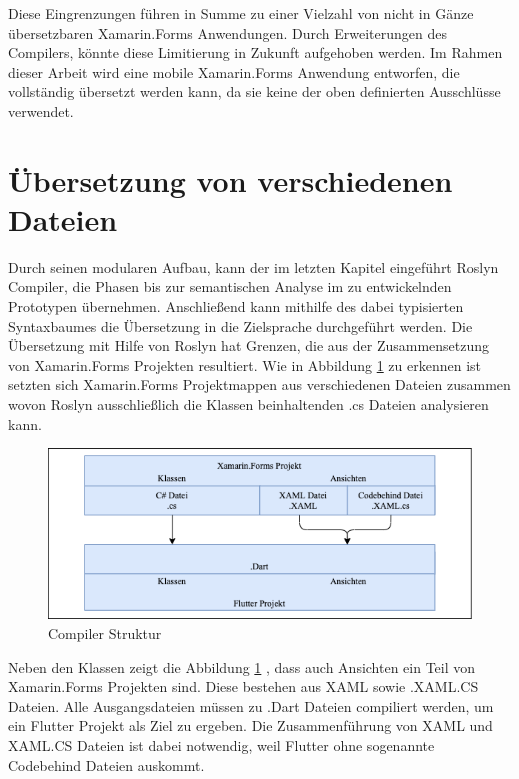 Diese Eingrenzungen führen in Summe zu einer Vielzahl von nicht in Gänze übersetzbaren Xamarin.Forms Anwendungen.  Durch Erweiterungen des Compilers, könnte diese Limitierung in Zukunft aufgehoben werden.  Im Rahmen dieser Arbeit wird eine mobile Xamarin.Forms Anwendung entworfen, die vollständig übersetzt werden kann, da sie keine der oben definierten Ausschlüsse verwendet. 


\section{Übersetzung von verschiedenen Dateien}
Durch seinen modularen Aufbau,  kann der im letzten Kapitel eingeführt Roslyn Compiler,  die Phasen bis zur semantischen Analyse im zu entwickelnden Prototypen übernehmen.  Anschließend kann mithilfe des dabei typisierten Syntaxbaumes die Übersetzung in die Zielsprache durchgeführt werden.   Die Übersetzung mit Hilfe von Roslyn hat Grenzen, die aus der Zusammensetzung von Xamarin.Forms Projekten resultiert.  Wie in Abbildung \ref{fig:CompilerStruktur} zu erkennen ist setzten sich Xamarin.Forms Projektmappen aus verschiedenen Dateien zusammen wovon Roslyn ausschließlich die Klassen beinhaltenden .cs Dateien analysieren kann. 

\begin{figure}[!ht]
 \includegraphics[width=14.5cm]{Images/Compiler/CompilerArchitecture.png}
 \caption{Compiler Struktur}
 \label{fig:CompilerStruktur}
\end{figure}

Neben den Klassen zeigt die Abbildung \ref{fig:CompilerStruktur} , dass auch Ansichten ein Teil von Xamarin.Forms Projekten sind.  Diese bestehen aus XAML sowie .XAML.CS Dateien.  Alle Ausgangsdateien müssen zu .Dart Dateien compiliert werden,  um ein Flutter Projekt als Ziel zu ergeben.  Die Zusammenführung von XAML und XAML.CS Dateien ist dabei notwendig,  weil Flutter ohne sogenannte Codebehind Dateien auskommt. 

